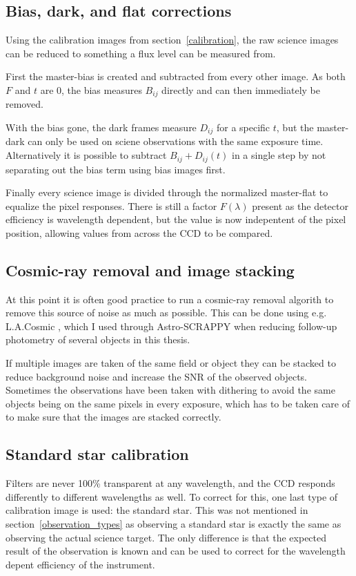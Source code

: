 \documentclass[a4paper,oneside,12pt, class=Latex/Classes/PhDthesisPSnPDF, crop=false]{standalone}
\begin{document}
\subsection{Bias, dark, and flat corrections}
Using the calibration images from section~\ref{calibration}, the raw science images can be reduced to something a flux level can be measured from. 

First the master-bias is created and subtracted from every other image. As both $F$ and $t$ are 0, the bias measures $B_{ij}$ directly and can then immediately be removed.

With the bias gone, the dark frames measure $D_{ij}$ for a specific $t$, but the master-dark can only be used on sciene observations with the same exposure time. Alternatively it is possible to subtract $B_{ij} + D_{ij}(t)$ in a single step by not separating out the bias term using bias images first.

Finally every science image is divided through the normalized master-flat to equalize the pixel responses. There is still a factor $F(\lambda)$ present as the detector efficiency is wavelength dependent, but the value is now indepentent of the pixel position, allowing values from across the CCD to be compared.

\subsection{Cosmic-ray removal and image stacking}
At this point it is often good practice to run a cosmic-ray removal algorith to remove this source of noise as much as possible. This can be done using e.g. L.A.Cosmic \citep{lacosmic}, which I used through Astro-SCRAPPY \citep{astroSCRAPPY} when reducing follow-up photometry of several objects in this thesis.

If multiple images are taken of the same field or object they can be stacked to reduce background noise and increase the SNR of the observed objects. Sometimes the observations have been taken with dithering to avoid the same objects being on the same pixels in every exposure, which has to be taken care of to make sure that the images are stacked correctly.

\subsection{Standard star calibration}
Filters are never 100\% transparent at any wavelength, and the CCD responds differently to different wavelengths as well. To correct for this, one last type of calibration image is used: the standard star. This was not mentioned in section~\ref{observation_types} as observing a standard star is exactly the same as observing the actual science target. The only difference is that the expected result of the observation is known and can be used to correct for the wavelength depent efficiency of the instrument.
\end{document}
